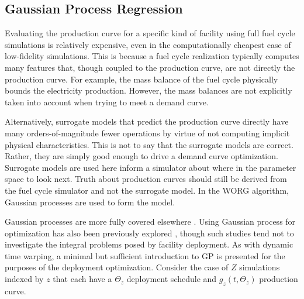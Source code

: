 \subsection{Gaussian Process Regression}
\label{gp}

Evaluating the production curve for a specific kind of facility using 
full fuel cycle simulations is relatively expensive, even in the 
computationally cheapest case of low-fidelity simulations. This is because a 
fuel cycle realization 
typically computes many features that, though coupled to the production 
curve, are not directly the production curve. For example, the mass balance of 
the fuel cycle physically bounds the electricity production. However, the    
mass balances are not explicitly taken into account when trying to meet
a demand curve.

Alternatively, surrogate models that predict the production curve directly
have many orders-of-magnitude fewer operations by virtue of not computing
implicit physical characteristics. This is not to say that the surrogate 
models are correct.  Rather, they are simply good enough to drive a demand
curve 
optimization. Surrogate models are used here inform a simulator about where
in the parameter space to look next. Truth about production curves should
still be derived from the fuel cycle simulator and not the surrogate model.
In the WORG algorithm, Gaussian processes are used to form the model. 

Gaussian processes are more fully covered elsewhere 
\cite{rasmussen2006gaussian}. Using Gaussian process for optimization has 
also been previously explored \cite{osborne2009gaussian}, though such studies 
tend not to 
investigate the integral problems posed by facility deployment. As with 
dynamic time warping, a minimal but sufficient introduction to GP is presented 
for the purposes of the deployment optimization.
Consider the case of $Z$ simulations indexed by $z$ that each have a 
$\Theta_z$ deployment schedule and $g_z(t, \Theta_z)$ production curve.

